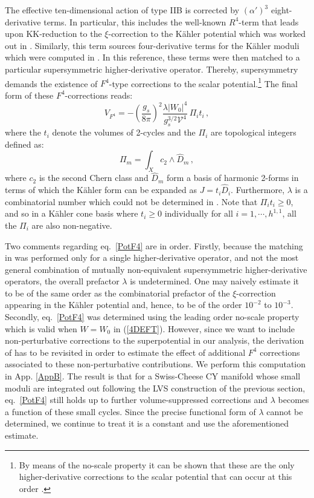\documentclass[11pt,a4paper]{article}
\newcommand{\be}{\begin{equation}}
\newcommand{\ee}{\end{equation}}
\newcommand\vo{{\mathcal{V}}}
\begin{document}
The effective ten-dimensional action of type IIB is corrected by $(\alpha')^3$ eight-derivative terms. In particular, this includes the well-known $R^4$-term \cite{Gross:1986iv} that leads upon KK-reduction to the $\xi$-correction to the K\"ahler potential which was worked out in \cite{Becker:2002nn}. Similarly, this term sources four-derivative terms for the K\"ahler moduli which were computed in \cite{Ciupke:2015msa}. In this reference, these terms were then matched to a particular supersymmetric higher-derivative operator. Thereby, supersymmetry demands the existence of $F^4$-type corrections to the scalar potential.\footnote{By means of the no-scale property it can be shown that these are the only higher-derivative corrections to the scalar potential that can occur at this order \cite{Ciupke:2016agp}.} The final form of these $F^4$-corrections reads:
\be
V_{F^4} = -\left(\frac{g_s}{8\pi}\right)^2 \frac{\lambda \lvert W_0 \lvert^4}{g_s^{3/2}\vo^4}\,\Pi_i t_i\,,
\label{PotF4}
\ee
where the $t_i$ denote the volumes of 2-cycles and the $\Pi_i$ are topological integers defined as:
\be
\Pi_m=\int_X c_2\wedge\hat{D}_m\,,
\label{eq:Pi}
\ee
where $c_2$ is the second Chern class and $\hat{D}_m$ form a basis of harmonic 2-forms in terms of which the K\"ahler form can be expanded as $J=t_i\hat{D}_i$. Furthermore, $\lambda$ is a combinatorial number which could not be determined in \cite{Ciupke:2015msa}. Note that $\Pi_i t_i \geq 0$, and so in a K\"ahler cone basis where $t_i \geq 0$ individually for all $i=1,\cdots,h^{1,1}$, all the $\Pi_i$ are also non-negative.

Two comments regarding eq.~\eqref{PotF4} are in order. Firstly, because the matching in \cite{Ciupke:2015msa} was performed only for a single higher-derivative operator, and not the most general combination of mutually non-equivalent supersymmetric higher-derivative operators, the overall prefactor $\lambda$ is undetermined. One may naively estimate it to be of the same order as the combinatorial prefactor of the $\xi$-correction appearing in the K\"ahler potential and, hence, to be of the order $10^{-2}$ to $10^{-3}$. Secondly, eq.~\eqref{PotF4} was determined using the leading order no-scale property which is valid when $W=W_0$ in (\ref{4DEFT}). However, since we want to include non-perturbative corrections to the superpotential in our analysis, the derivation of \cite{Ciupke:2015msa} has to be revisited in order to estimate the effect of additional $F^4$ corrections associated to these non-perturbative contributions. We perform this computation in App. \ref{AppB}. The result is that for a Swiss-Cheese CY manifold whose small moduli are integrated out following the LVS construction of the previous section, eq.~\eqref{PotF4} still holds up to further volume-suppressed corrections and $\lambda$ becomes a function of these small cycles. Since the precise functional form of $\lambda$ cannot be determined, we continue to treat it is a constant and use the aforementioned estimate.
\end{document}
